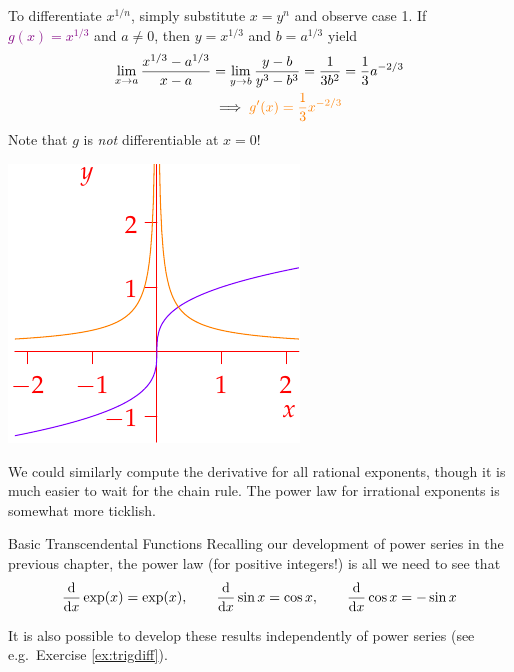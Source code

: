 \begin{examples}{}{}
\begin{enumerate}
	\begin{minipage}[t]{0.7\linewidth}\vspace{0pt}
		\item To differentiate $x^{1/n}$, simply substitute $x=y^n$ and observe case 1. If \textcolor{purple}{$g(x)=x^{1/3}$} and $a\neq 0$, then $y=x^{1/3}$ and $b=a^{1/3}$ yield
		\begin{align*}
			\lim_{x\to a}\frac{x^{1/3}-a^{1/3}}{x-a}&= \lim_{y\to b}\frac{y-b}{y^3-b^3} = \frac 1{3b^2}=\frac 13a^{-2/3}\\
			&\implies \textcolor{orange}{g'(x)=\frac 13x^{-2/3}}
		\end{align*}
		Note that $g$ is \emph{not} differentiable at $x=0$!
	\end{minipage}\begin{minipage}[t]{0.3\linewidth}\vspace{0pt}
		\flushright\includegraphics[scale=0.9]{diff-exthird}
	\end{minipage}
\end{enumerate}
 We could similarly compute the derivative for all rational exponents, though it is much easier to wait for the chain rule. The power law for irrational exponents is somewhat more ticklish.
\end{examples}





\begin{cor}{Basic Transcendental Functions}{}
Recalling our development of power series in the previous chapter, the power law (for positive integers!) is all we need to see that
\[\frac{\mathrm{d} }{\mathrm{d} x}\exp(x)=\exp(x),\qquad \frac{\mathrm{d} }{\mathrm{d} x}\sin x=\cos x,\qquad \frac{\mathrm{d} }{\mathrm{d} x}\cos x=-\sin x\]
\end{cor}

It is also possible to develop these results independently of power series (see e.g.\ Exercise \ref{ex:trigdiff}).
\goodbreak


